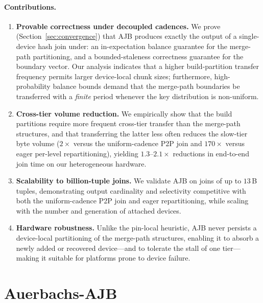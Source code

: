 \documentclass{article}
\begin{document}
\paragraph{Contributions.}
\begin{enumerate}[leftmargin=*]
    \item \textbf{Provable correctness under decoupled cadences.}
    We prove (Section~\ref{sec:convergence}) that AJB produces exactly the
    output of a single-device hash join under: an in-expectation balance
    guarantee for the merge-path partitioning, and a bounded-staleness
    correctness guarantee for the boundary vector. Our analysis indicates that a
    higher build-partition transfer frequency permits larger device-local chunk
    sizes; furthermore, high-probability balance bounds demand that the
    merge-path boundaries be transferred with a \emph{finite} period whenever the
    key distribution is non-uniform.

    \item \textbf{Cross-tier volume reduction.}
    We empirically show that the build partitions require more frequent
    cross-tier transfer than the merge-path structures, and that transferring the
    latter less often reduces the slow-tier byte volume ($2\times$ versus the
    uniform-cadence P2P join and $170\times$ versus eager per-level
    repartitioning), yielding $1.3$--$2.1\times$ reductions in end-to-end join
    time on our heterogeneous hardware.

    \item \textbf{Scalability to billion-tuple joins.}
    We validate AJB on joins of up to $13$\,B tuples, demonstrating output
    cardinality and selectivity competitive with both the uniform-cadence P2P
    join and eager repartitioning, while scaling with the number and generation
    of attached devices.

    \item \textbf{Hardware robustness.}
    Unlike the pin-local heuristic, AJB never persists a device-local
    partitioning of the merge-path structures, enabling it to absorb a newly
    added or recovered device---and to tolerate the stall of one tier---making it
    suitable for platforms prone to device failure.
\end{enumerate}

\section{Auerbachs-AJB}
\label{sec:ajb}
\end{document}
